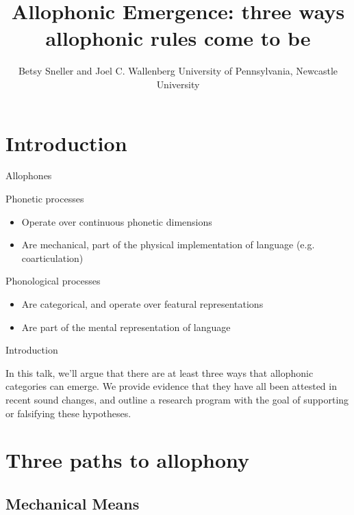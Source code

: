 \documentclass[hyperref={pdfpagelabels=false}]{beamer}
\title{Allophonic Emergence: three ways allophonic rules come to be}
\author{Betsy Sneller and Joel C. Wallenberg  University of Pennsylvania, Newcastle University}
\institute{}
\begin{document}
\begin{frame}[plain]
\titlepage
\end{frame}

\section{Introduction}
\begin{frame}{Allophones \small{\citep{fruehwald2013}}}

\begin{block}{Phonetic processes}
	\begin{itemize}
		\item Operate over continuous phonetic dimensions \pause
		\item Are mechanical, part of the physical implementation of language (e.g. coarticulation) \pause
	\end{itemize}
\end{block}

\begin{block}{Phonological processes}
	\begin{itemize}
		\item Are categorical, and operate over featural representations \pause
		\item Are part of the mental representation of language 
	\end{itemize}
\end{block}
			
\end{frame}

\begin{frame}{Introduction}

In this talk, we'll argue that there are at least three ways that allophonic categories can emerge. We provide evidence that they have all been attested in recent sound changes, and outline a research program with the goal of supporting or falsifying these hypotheses.

\end{frame}

\section[Outline]{}
\frame{\tableofcontents}

\section{Three paths to allophony}
\subsection{Mechanical Means}
\end{document}
